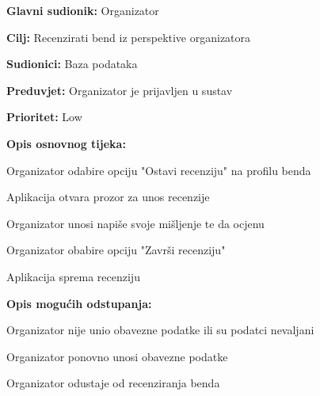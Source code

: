 \noindent {}
	\begin{packed_item}
		
		\item \textbf{Glavni sudionik:} Organizator
		\item \textbf{Cilj:} Recenzirati bend iz perspektive organizatora
		\item \textbf{Sudionici:} Baza podataka
		\item \textbf{Preduvjet:} Organizator je prijavljen u sustav
		\item \textbf{Prioritet:} Low
		\item \textbf{Opis osnovnog tijeka:} 
		
		\item[] \begin{packed_enum}
			
			\item Organizator odabire opciju "Ostavi recenziju" na profilu benda
			\item Aplikacija otvara prozor za unos recenzije
			\item Organizator unosi napiše svoje mišljenje te da ocjenu
			\item Organizator obabire opciju "Završi recenziju"
			\item Aplikacija sprema recenziju
		\end{packed_enum} 
	
		\item  \textbf{Opis mogućih odstupanja:}
		\item[] \begin{packed_item}

			\item[4.a] Organizator nije unio obavezne podatke ili su podatci nevaljani
			\item[] \begin{packed_enum}
				\item Organizator ponovno unosi obavezne podatke
				\item Organizator odustaje od recenziranja benda
			\end{packed_enum}	
			
		\end{packed_item} 
	\end{packed_item}

